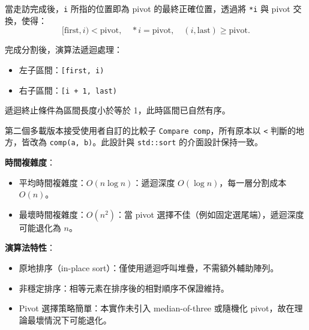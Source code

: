 \documentclass[a4paper,12pt]{article}
\begin{document}
當走訪完成後，\texttt{i} 所指的位置即為 pivot 的最終正確位置，透過將 \texttt{*i} 與 pivot 交換，使得：
\[[\text{first}, i) < \text{pivot}, \quad *i = \text{pivot}, \quad (i, \text{last}) \ge \text{pivot}.\]

完成分割後，演算法遞迴處理：
\begin{itemize}
  \item 左子區間：\texttt{[first, i)}
  \item 右子區間：\texttt{[i + 1, last)}
\end{itemize}

遞迴終止條件為區間長度小於等於 1，此時區間已自然有序。

第二個多載版本接受使用者自訂的比較子 \texttt{Compare comp}，所有原本以 \texttt{<} 判斷的地方，皆改為 \texttt{comp(a, b)}。此設計與 \texttt{std::sort} 的介面設計保持一致。

\textbf{時間複雜度}：
\begin{itemize}
  \item 平均時間複雜度：$O(n \log n)$：遞迴深度 $O(\log n)$，每一層分割成本 $O(n)$。
  \item 最壞時間複雜度：$O(n^2)$：當 pivot 選擇不佳（例如固定選尾端），遞迴深度可能退化為 $n$。
\end{itemize}

\textbf{演算法特性}：
\begin{itemize}
  \item 原地排序（in-place sort）：僅使用遞迴呼叫堆疊，不需額外輔助陣列。
  \item 非穩定排序：相等元素在排序後的相對順序不保證維持。
  \item Pivot 選擇策略簡單：本實作未引入 median-of-three 或隨機化 pivot，故在理論最壞情況下可能退化。
\end{itemize}
\end{document}
